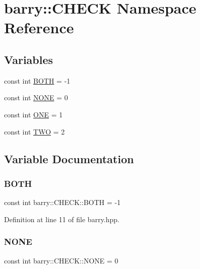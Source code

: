 \hypertarget{namespacebarry_1_1_c_h_e_c_k}{}\section{barry\+:\+:C\+H\+E\+CK Namespace Reference}
\label{namespacebarry_1_1_c_h_e_c_k}
\subsection*{Variables}
\begin{DoxyCompactItemize}
\item 
const int \hyperlink{namespacebarry_1_1_c_h_e_c_k_a604b0ef801ff768bd8561362cef579b2}{B\+O\+TH} = -\/1
\item 
const int \hyperlink{namespacebarry_1_1_c_h_e_c_k_aa64c84acf4e28b6cb1243ccda1eec41c}{N\+O\+NE} = 0
\item 
const int \hyperlink{namespacebarry_1_1_c_h_e_c_k_add50baad3a196b1979efbbf9e6c86913}{O\+NE} = 1
\item 
const int \hyperlink{namespacebarry_1_1_c_h_e_c_k_a6aa56c3d8a8260d90867278d21ace4d2}{T\+WO} = 2
\end{DoxyCompactItemize}


\subsection{Variable Documentation}
\mbox{\label{namespacebarry_1_1_c_h_e_c_k_a604b0ef801ff768bd8561362cef579b2}} 
\subsubsection{\texorpdfstring{B\+O\+TH}{BOTH}}
{\footnotesize\ttfamily const int barry\+::\+C\+H\+E\+C\+K\+::\+B\+O\+TH = -\/1}



Definition at line 11 of file barry.\+hpp.

\mbox{\label{namespacebarry_1_1_c_h_e_c_k_aa64c84acf4e28b6cb1243ccda1eec41c}} 
\subsubsection{\texorpdfstring{N\+O\+NE}{NONE}}
{\footnotesize\ttfamily const int barry\+::\+C\+H\+E\+C\+K\+::\+N\+O\+NE = 0}



